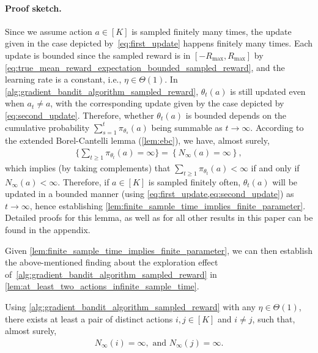 \paragraph{Proof sketch.} Since we assume action $a \in [K]$ is sampled finitely many times, the update given in the case depicted by~\cref{eq:first_update} happens finitely many times. Each update is bounded since the sampled reward is in $[-R_{\max}, R_{\max}]$ by \cref{eq:true_mean_reward_expectation_bounded_sampled_reward}, and the learning rate is a constant, i.e., $\eta \in \Theta(1)$. In \cref{alg:gradient_bandit_algorithm_sampled_reward}, $\theta_t(a)$ is still updated even when $a_t \ne a$, with the corresponding update given by the case depicted by \cref{eq:second_update}. Therefore, whether $\theta_t(a)$ is bounded depends on the cumulative probability $\sum_{s=1}^{t}{ \pi_{\theta_s}(a) }$ being summable as $t \to \infty$. According to the extended Borel-Cantelli lemma (\cref{lem:ebc}), we have, almost surely,
\begin{align}
\label{eq:ebc_result}
    \Big\{ \sum_{t \ge 1} \pi_{\theta_t}(a) =\infty \Big\} = \left\{ N_\infty(a )=\infty \right\},
\end{align}
which implies (by taking complements) that $\sum_{t \ge 1} \pi_{\theta_t}(a) < \infty$ if and only if $N_\infty(a) < \infty$. Therefore, if $a \in [K]$ is sampled finitely often, $\theta_t(a)$ will be updated in a bounded manner (using \cref{eq:first_update,eq:second_update}) as $t \to \infty$, hence establishing \cref{lem:finite_sample_time_implies_finite_parameter}. Detailed proofs for this lemma, as well as for all other results in this paper can be found in the appendix. %

Given \cref{lem:finite_sample_time_implies_finite_parameter}, we can then establish 
the above-mentioned finding about the exploration effect of~\cref{alg:gradient_bandit_algorithm_sampled_reward} in \cref{lem:at_least_two_actions_infinite_sample_time}.
\begin{lemma}
\label{lem:at_least_two_actions_infinite_sample_time}
Using \cref{alg:gradient_bandit_algorithm_sampled_reward} with any $\eta \in \Theta(1)$, there exists at least a pair of distinct actions $i, j \in [K]$ and $i \ne j$, such that, almost surely,
\begin{align}
\label{lem:at_least_two_actions_infinite_sample_time_claim}
    N_\infty(i) = \infty, \text{ and } N_\infty(j) = \infty.
\end{align}
\end{lemma}
